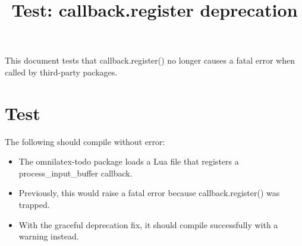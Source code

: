 \documentclass{article}
\begin{document}
\title{Test: callback.register deprecation}
\maketitle

This document tests that callback.register() no longer causes a
fatal error when called by third-party packages.

\section{Test}
The following should compile without error:

\begin{itemize}
    \item The omnilatex-todo package loads a Lua file that registers
          a process\_input\_buffer callback.
    \item Previously, this would raise a fatal error because
          callback.register() was trapped.
    \item With the graceful deprecation fix, it should compile
          successfully with a warning instead.
\end{itemize}
\end{document}
